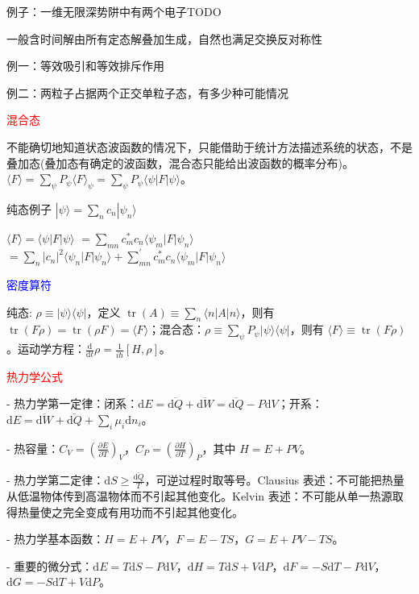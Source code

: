 \documentclass[a4paper,8pt]{extarticle} %
\newcommand{\bluetext}[1]{\textcolor{blue}{#1}}
\newcommand{\redtext}[1]{\textcolor{red}{#1}}
\begin{document}
\begin{multicols}{3}
例子：一维无限深势阱中有两个电子TODO

一般含时间解由所有定态解叠加生成，自然也满足交换反对称性

例一：等效吸引和等效排斥作用

例二：两粒子占据两个正交单粒子态，有多少种可能情况

\redtext{混合态}

不能确切地知道状态波函数的情况下，只能借助于统计方法描述系统的状态，不是叠加态(叠加态有确定的波函数，混合态只能给出波函数的概率分布)。$\langle F \rangle = \sum_{\psi} P_{\psi}\langle F \rangle_{\psi} = \sum_{\psi} P_{\psi} \langle\psi| F |\psi\rangle$。

纯态例子 $|\psi\rangle=\sum_{n}c_n|\psi_n\rangle$

$\langle F \rangle=\langle\psi|F|\psi\rangle$
$=\sum_{mn}c_m^*c_n\langle\psi_m|F|\psi_n\rangle$
$=\sum_n|c_n|^2\langle\psi_n|F|\psi_n\rangle+\sum_{mn}^\prime c_m^*c_n\langle\psi_m|F|\psi_n\rangle$

\bluetext{密度算符}

纯态: $\rho \equiv |\psi\rangle \langle\psi|$，定义 $\operatorname{tr}(A) \equiv \sum_{n}\langle n|A|n\rangle$，则有 $\operatorname{tr}(F\rho) = \operatorname{tr}(\rho F) = \langle F \rangle$；混合态：$\rho \equiv \sum_{\psi} P_{\psi}|\psi\rangle \langle\psi|$，则有 $\langle F \rangle \equiv \operatorname{tr}(F\rho)$。运动学方程：$\frac{\mathrm{d}}{\mathrm{d}t}\rho = \frac{1}{i\hbar}[H,\rho]$。

\redtext{热力学公式}

- 热力学第一定律：闭系：$\mathrm{d}E = \overline{\mathrm{d}Q} + \overline{\mathrm{d}W} = \overline{\mathrm{d}Q} - P\mathrm{d}V$；开系：$\mathrm{d}E = \overline{\mathrm{d}W} + \overline{\mathrm{d}Q} + \sum_i \mu_i\mathrm{d}n_i$。

- 热容量：$C_V = \left(\frac{\partial E}{\partial T}\right)_V$，$C_P = \left(\frac{\partial H}{\partial T}\right)_P$，其中 $H = E + PV$。

- 热力学第二定律：$\mathrm{d}S \geq \frac{\overline{\mathrm{d}Q}}{T}$，可逆过程时取等号。Clausius 表述：不可能把热量从低温物体传到高温物体而不引起其他变化。Kelvin 表述：不可能从单一热源取得热量使之完全变成有用功而不引起其他变化。

- 热力学基本函数：$H = E + PV$，$F = E - TS$，$G = E + PV - TS$。

- 重要的微分式：$\mathrm{d}E = T\mathrm{d}S-P\mathrm{d}V$，$\mathrm{d}H = T\mathrm{d}S+V\mathrm{d}P$，$\mathrm{d}F = -S\mathrm{d}T-P\mathrm{d}V$，$\mathrm{d}G = -S\mathrm{d}T + V\mathrm{d}P$。


\end{multicols}
\end{document}
